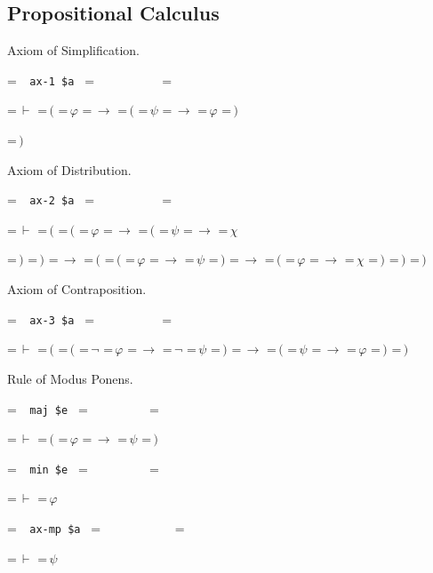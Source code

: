 \newbox\mlinebox
\newbox\mtrialbox
\newbox\startprefix  %
\newbox\contprefix  %
\def\startm{  %
  \setbox\mlinebox=\hbox{\unhcopy\startprefix}
}
\def\m#1{  %
  \setbox\mtrialbox=\hbox{\unhcopy\mlinebox $\,#1$}
  \ifdim\wd\mtrialbox>\hsize
    \box\mlinebox
    \setbox\mlinebox=\hbox{\unhcopy\contprefix $\,#1$}
  \else
    \setbox\mlinebox=\hbox{\unhbox\mtrialbox}
  \fi
}
\def\endm{  %
  \box\mlinebox
}

\subsection{Propositional Calculus}\label{propcalc}

Axiom of Simplification.\label{ax1}

\setbox\startprefix=\hbox{\tt \ \ ax-1\ \$a\ }
\setbox\contprefix=\hbox{\tt \ \ \ \ \ \ \ \ \ \ }
\startm
\m{\vdash}\m{(}\m{\varphi}\m{\rightarrow}\m{(}\m{\psi}\m{\rightarrow}\m{\varphi}\m{)}
\m{)}
\endm

\noindent Axiom of Distribution.

\setbox\startprefix=\hbox{\tt \ \ ax-2\ \$a\ }
\setbox\contprefix=\hbox{\tt \ \ \ \ \ \ \ \ \ \ }
\startm
\m{\vdash}\m{(}\m{(}\m{\varphi}\m{\rightarrow}\m{(}\m{\psi}\m{\rightarrow}\m{\chi}
\m{)}\m{)}\m{\rightarrow}\m{(}\m{(}\m{\varphi}\m{\rightarrow}\m{\psi}\m{)}\m{
\rightarrow}\m{(}\m{\varphi}\m{\rightarrow}\m{\chi}\m{)}\m{)}\m{)}
\endm

\noindent Axiom of Contraposition.

\setbox\startprefix=\hbox{\tt \ \ ax-3\ \$a\ }
\setbox\contprefix=\hbox{\tt \ \ \ \ \ \ \ \ \ \ }
\startm
\m{\vdash}\m{(}\m{(}\m{\lnot}\m{\varphi}\m{\rightarrow}\m{\lnot}\m{\psi}\m{)}\m{
\rightarrow}\m{(}\m{\psi}\m{\rightarrow}\m{\varphi}\m{)}\m{)}
\endm


\noindent Rule of Modus Ponens.\label{axmp}

\setbox\startprefix=\hbox{\tt \ \ maj\ \$e\ }
\setbox\contprefix=\hbox{\tt \ \ \ \ \ \ \ \ \ }
\startm
\m{\vdash}\m{(}\m{\varphi}\m{\rightarrow}\m{\psi}\m{)}
\endm

\setbox\startprefix=\hbox{\tt \ \ min\ \$e\ }
\setbox\contprefix=\hbox{\tt \ \ \ \ \ \ \ \ \ }
\startm
\m{\vdash}\m{\varphi}
\endm

\setbox\startprefix=\hbox{\tt \ \ ax-mp\ \$a\ }
\setbox\contprefix=\hbox{\tt \ \ \ \ \ \ \ \ \ \ \ }
\startm
\m{\vdash}\m{\psi}
\endm



